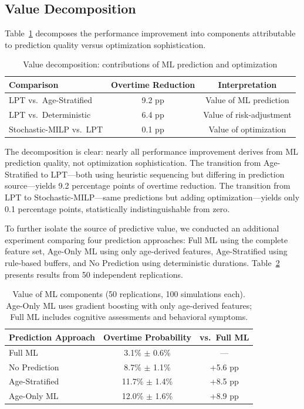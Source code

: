 \documentclass[msom,blindrev]{informs3}
\begin{document}
\subsection{Value Decomposition}
\label{sec:value_analysis}

Table~\ref{tab:value_analysis} decomposes the performance improvement into components attributable to prediction quality versus optimization sophistication.

\begin{table}[htbp]
\centering
\caption{Value decomposition: contributions of ML prediction and optimization}
\label{tab:value_analysis}
\begin{tabular}{@{}lcc@{}}
\toprule
\textbf{Comparison} & \textbf{Overtime Reduction} & \textbf{Interpretation} \\
\midrule
LPT vs.\ Age-Stratified & 9.2 pp & Value of ML prediction \\
LPT vs.\ Deterministic & 6.4 pp & Value of risk-adjustment \\
Stochastic-MILP vs.\ LPT & 0.1 pp & Value of optimization \\
\bottomrule
\end{tabular}
\end{table}

The decomposition is clear: nearly all performance improvement derives from ML prediction quality, not optimization sophistication. The transition from Age-Stratified to LPT---both using heuristic sequencing but differing in prediction source---yields 9.2 percentage points of overtime reduction. The transition from LPT to Stochastic-MILP---same predictions but adding optimization---yields only 0.1 percentage points, statistically indistinguishable from zero.

To further isolate the source of predictive value, we conducted an additional experiment comparing four prediction approaches: Full ML using the complete feature set, Age-Only ML using only age-derived features, Age-Stratified using rule-based buffers, and No Prediction using deterministic durations. Table~\ref{tab:ml_value} presents results from 50 independent replications.

\begin{table}[htbp]
\centering
\caption{Value of ML components (50 replications, 100 simulations each). Age-Only ML uses gradient boosting with only age-derived features; Full ML includes cognitive assessments and behavioral symptoms.}
\label{tab:ml_value}
\begin{tabular}{@{}lcc@{}}
\toprule
\textbf{Prediction Approach} & \textbf{Overtime Probability} & \textbf{vs.\ Full ML} \\
\midrule
Full ML & 3.1\% $\pm$ 0.6\% & --- \\
No Prediction & 8.7\% $\pm$ 1.1\% & +5.6 pp \\
Age-Stratified & 11.7\% $\pm$ 1.4\% & +8.5 pp \\
Age-Only ML & 12.0\% $\pm$ 1.6\% & +8.9 pp \\
\bottomrule
\end{tabular}
\end{table}
\end{document}
